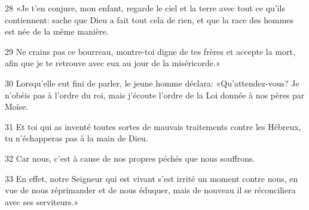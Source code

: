 
28 «Je t’en conjure, mon enfant, regarde le ciel et la terre avec tout ce qu’ils contiennent: sache que Dieu a fait tout cela de rien, et que la race des hommes est née de la même manière.

29 Ne crains pas ce bourreau, montre-toi digne de tes frères et accepte la mort, afin que je te retrouve avec eux au jour de la miséricorde.»

30 Lorsqu’elle eut fini de parler, le jeune homme déclara: «Qu’attendez-vous? Je n’obéis pas à l’ordre du roi, mais j’écoute l’ordre de la Loi donnée à nos pères par Moïse.

31 Et toi qui as inventé toutes sortes de mauvais traitements contre les Hébreux, tu n’échapperas pas à la main de Dieu.

32 Car nous, c’est à cause de nos propres péchés que nous souffrons.

33 En effet, notre Seigneur qui est vivant s’est irrité un moment contre nous, en vue de nous réprimander et de nous éduquer, mais de nouveau il se réconciliera avec ses serviteurs.»
